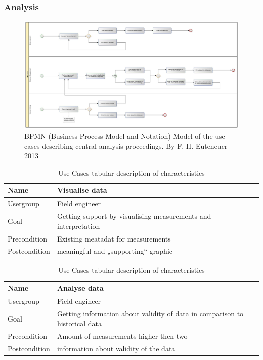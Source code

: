 \subsubsection{Analysis}

\begin{figure}[H]
	\centering
 	 \includegraphics[scale=0.24]{graphics/bpmn_use-cases_analysis.jpg} 
	\caption{BPMN (Business Process Model and Notation) Model of the use cases describing central analysis proceedings. By F. H. Euteneuer 2013}
	 \label{fig:bpmn_use-case_analysis}
\end{figure}

\begin{table}[H]
\centering
\begin{tabular}{l | p{11cm}}
Name & Visualise data\\ \hline 
Usergroup & Field engineer\\ \hline 
Goal & Getting support by visualising measurements and interpretation\\ \hline 
Precondition & Existing meatadat for measurements\\ \hline 
Postcondition & meaningful and „supporting“ graphic\\
\end{tabular}
\caption{Use Cases tabular description of characteristics} 
\label{table:use case description "Visualise data"}
\end{table}

\begin{table}[H]
\centering
\begin{tabular}{l | p{11cm}}
Name & Analyse data\\ \hline 
Usergroup & Field engineer\\ \hline 
Goal & Getting information about validity of data in comparison to historical data\\ \hline 
Precondition & Amount of measurements higher then two\\ \hline 
Postcondition & information about validity of the data\\ 
\end{tabular}
\caption{Use Cases tabular description of characteristics} 
\label{table:use case description of "Analyse data"}
\end{table}





